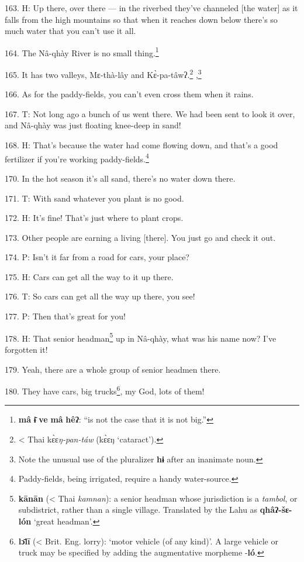 163. H: Up there, over there --- in the riverbed they've channeled [the water]
as it falls from the high mountains so that when it reaches down below there's
so much water that you can't use it all.

164. The Nâ-qhày River is no small thing.\footnote{\textbf{mâ} \textbf{ɨ̄} \textbf{ve} \textbf{mâ} \textbf{hêʔ}: ``is not the case that it is not big.''}

165. It has two valleys, Mɛ-thà-lây and Kɛ̀-pa-tâwʔ.\footnote{< Thai kɛ̀ɛ\textit{ŋ-pan-táw} (kɛ̀ɛŋ `cataract').} ,\footnote{Note the unusual use of the pluralizer \textbf{hɨ} after an inanimate noun.}

166. As for the paddy-fields, you can't even cross them when it rains.

167. T: Not long ago a bunch of us went there. We had been sent to look it over,
and Nâ-qhày was just floating knee-deep in sand!

168. H: That's because the water had come flowing down, and that's a good fertilizer
if you're working paddy-fields.\footnote{Paddy-fields, being irrigated, require a handy water-source.}

170. In the hot season it's all sand, there's no water down there.

171. T: With sand whatever you plant is no good.

172. H: It's fine! That's just where to plant crops.

173. Other people are earning a living [there]. You just go and check it out.

174. P: Isn't it far from a road for cars, your place?

175. H: Cars can get all the way to it up there.

176. T: So cars can get all the way up there, you see!

177. P: Then that's great for you!

178. H: That senior headman\footnote{\textbf{kānān} (< Thai \textit{kamnan}): a senior headman whose jurisdiction is a \textit{tambol}, or subdistrict, rather than a single village. Translated by the Lahu as \textbf{qhâʔ-šɛ-lón} `great headman'.} up in Nâ-qhày, what was his name now? I've forgotten
it!

179. Yeah, there are a whole group of senior headmen there.

180. They have cars, big trucks\footnote{\textbf{lɔ̄lī} (< Brit. Eng. lorry): `motor vehicle (of any kind)'. A large vehicle or truck may be specified by adding the augmentative morpheme -\textbf{ló}.}, my God, lots of them!

